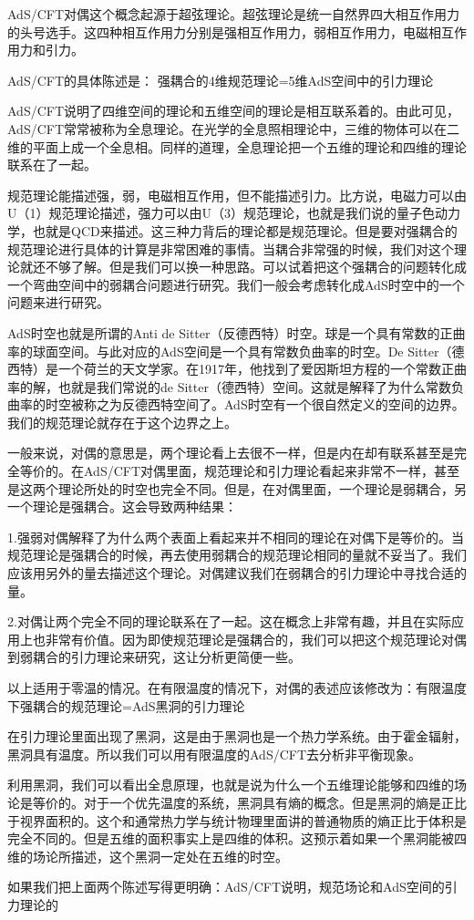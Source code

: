 
AdS/CFT对偶这个概念起源于超弦理论。超弦理论是统一自然界四大相互作用力的头号选手。这四种相互作用力分别是强相互作用力，弱相互作用力，电磁相互作用力和引力。

AdS/CFT的具体陈述是：
强耦合的4维规范理论=5维AdS空间中的引力理论

AdS/CFT说明了四维空间的理论和五维空间的理论是相互联系着的。由此可见，AdS/CFT常常被称为全息理论。在光学的全息照相理论中，三维的物体可以在二维的平面上成一个全息相。同样的道理，全息理论把一个五维的理论和四维的理论联系在了一起。

规范理论能描述强，弱，电磁相互作用，但不能描述引力。比方说，电磁力可以由U（1）规范理论描述，强力可以由U（3）规范理论，也就是我们说的量子色动力学，也就是QCD来描述。这三种力背后的理论都是规范理论。但是要对强耦合的规范理论进行具体的计算是非常困难的事情。当耦合非常强的时候，我们对这个理论就还不够了解。但是我们可以换一种思路。可以试着把这个强耦合的问题转化成一个弯曲空间中的弱耦合问题进行研究。我们一般会考虑转化成AdS时空中的一个问题来进行研究。

AdS时空也就是所谓的Anti de Sitter（反德西特）时空。球是一个具有常数的正曲率的球面空间。与此对应的AdS空间是一个具有常数负曲率的时空。De Sitter（德西特）是一个荷兰的天文学家。在1917年，他找到了爱因斯坦方程的一个常数正曲率的解，也就是我们常说的de Sitter（德西特）空间。这就是解释了为什么常数负曲率的时空被称之为反德西特空间了。AdS时空有一个很自然定义的空间的边界。我们的规范理论就存在于这个边界之上。

一般来说，对偶的意思是，两个理论看上去很不一样，但是内在却有联系甚至是完全等价的。在AdS/CFT对偶里面，规范理论和引力理论看起来非常不一样，甚至是这两个理论所处的时空也完全不同。但是，在对偶里面，一个理论是弱耦合，另一个理论是强耦合。这会导致两种结果：

1.强弱对偶解释了为什么两个表面上看起来并不相同的理论在对偶下是等价的。当规范理论是强耦合的时候，再去使用弱耦合的规范理论相同的量就不妥当了。我们应该用另外的量去描述这个理论。对偶建议我们在弱耦合的引力理论中寻找合适的量。

2.对偶让两个完全不同的理论联系在了一起。这在概念上非常有趣，并且在实际应用上也非常有价值。因为即使规范理论是强耦合的，我们可以把这个规范理论对偶到弱耦合的引力理论来研究，这让分析更简便一些。

以上适用于零温的情况。在有限温度的情况下，对偶的表述应该修改为：有限温度下强耦合的规范理论=AdS黑洞的引力理论

在引力理论里面出现了黑洞，这是由于黑洞也是一个热力学系统。由于霍金辐射，黑洞具有温度。所以我们可以用有限温度的AdS/CFT去分析非平衡现象。

利用黑洞，我们可以看出全息原理，也就是说为什么一个五维理论能够和四维的场论是等价的。对于一个优先温度的系统，黑洞具有熵的概念。但是黑洞的熵是正比于视界面积的。这个和通常热力学与统计物理里面讲的普通物质的熵正比于体积是完全不同的。但是五维的面积事实上是四维的体积。这预示着如果一个黑洞能被四维的场论所描述，这个黑洞一定处在五维的时空。

如果我们把上面两个陈述写得更明确：AdS/CFT说明，规范场论和AdS空间的引力理论的

